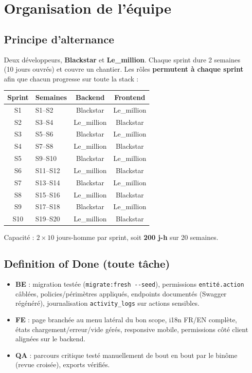 \documentclass[11pt,a4paper]{article}
\begin{document}
\section{Organisation de l'équipe}

\subsection{Principe d'alternance}

Deux développeurs, \textbf{Blackstar} et \textbf{Le\_million}. Chaque sprint dure 2 semaines (10 jours ouvrés) et couvre un chantier. Les rôles \textbf{permutent à chaque sprint} afin que chacun progresse sur toute la stack :

\begin{tabularx}{\textwidth}{|c|l|c|c|}
\hline
\rowcolor{peklight}\textbf{Sprint} & \textbf{Semaines} & \textbf{Backend} & \textbf{Frontend} \\ \hline
S1 & S1--S2 & Blackstar & Le\_million \\ \hline
S2 & S3--S4 & Le\_million & Blackstar \\ \hline
S3 & S5--S6 & Blackstar & Le\_million \\ \hline
S4 & S7--S8 & Le\_million & Blackstar \\ \hline
S5 & S9--S10 & Blackstar & Le\_million \\ \hline
S6 & S11--S12 & Le\_million & Blackstar \\ \hline
S7 & S13--S14 & Blackstar & Le\_million \\ \hline
S8 & S15--S16 & Le\_million & Blackstar \\ \hline
S9 & S17--S18 & Blackstar & Le\_million \\ \hline
S10 & S19--S20 & Le\_million & Blackstar \\ \hline
\end{tabularx}

Capacité : $2 \times 10$ jours-homme par sprint, soit \textbf{200 j-h} sur 20 semaines.

\subsection{Definition of Done (toute tâche)}

\begin{itemize}[nosep]
  \item \textbf{BE} : migration testée (\texttt{migrate:fresh -{}-seed}), permissions \texttt{entité.action} câblées, policies/périmètres appliqués, endpoints documentés (Swagger régénéré), journalisation \texttt{activity\_logs} sur actions sensibles.
  \item \textbf{FE} : page branchée au menu latéral du bon scope, i18n FR/EN complète, états chargement/erreur/vide gérés, responsive mobile, permissions côté client alignées sur le backend.
  \item \textbf{QA} : parcours critique testé manuellement de bout en bout par le binôme (revue croisée), exports vérifiés.
\end{itemize}
\end{document}
